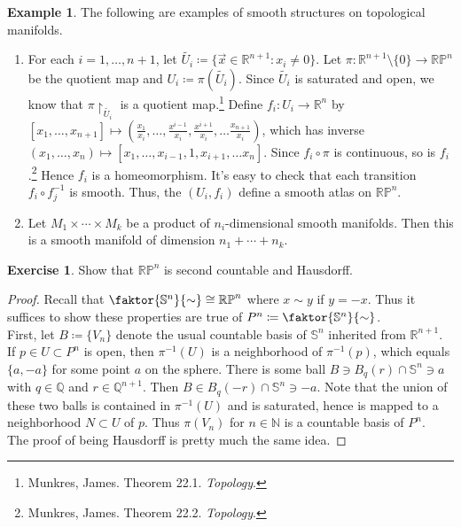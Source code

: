 \documentclass[10pt,letterpaper,cm]{nupset}
\theoremstyle{definition}
\newtheorem{exmp}{Example}
\newtheorem{exercise}{Exercise}
\newcommand{\N}{\mathbb N}
\newcommand{\Q}{\mathbb Q}
\newcommand{\R}{\mathbb R}
\newcommand{\RP}{\mathbb{RP}}
\renewcommand{\S}{\mathbb S}
\newcommand{\1}{\mathbf{1}}
\newcommand{\x}{\vec x}
\newcommand{\0}{\vec 0}
\begin{document}
\begin{exmp}{The following are examples of smooth structures on topological manifolds.}
\begin{enumerate}
\item For each $i = 1, \ldots, n+1$, let $\tilde{U_i}\coloneqq  \{\x \in \R^{n+1} : x_i \ne 0\}$. Let $\pi: \R^{n+1} \setminus\{0\} \to \RP^n$ be the quotient map and $U_i \coloneqq  \pi(\tilde{U_i})$. Since $\tilde{U_i}$ is saturated and open, we know that $\pi \restriction_{\tilde{U_i}}$ is a quotient map.\footnote{Munkres, James. Theorem 22.1. \textit{Topology}.} Define $f_i : U_i \to \R^n$ by $[x_1, \ldots, x_{n+1}] \mapsto (\frac{x_1}{x_i}, \ldots, \frac{x^{i-1}}{x_i}, \frac{x^{i+1}}{x_i}, \ldots \frac{x_{n+1}}{x_i})$, which has inverse $(x_1, \ldots, x_n) \mapsto [x_1, \ldots, x_{i-1}, 1, x_{i+1}, \ldots x_n]$. Since $f_i \circ \pi$ is continuous, so is $f_i$.\footnote{Munkres, James. Theorem 22.2. \textit{Topology}.} Hence $f_i$ is a homeomorphism. It's easy to check that each transition $f_i \circ f_j^{-1}$ is smooth. Thus, the $(U_i, f_i)$ define a smooth atlas on $\RP^n$.
\item Let $M_1 \times \cdots \times M_k$ be a product of $n_i$-dimensional smooth manifolds. Then this is a smooth manifold of dimension $n_1 + \cdots + n_k$.
\end{enumerate}

\end{exmp}

\begin{exercise} Show that $\RP^n$ is second countable and Hausdorff. 
\end{exercise}

\begin{proof}
Recall that $\faktor{\S^n}{\sim} \cong \RP^n$ where $x \sim y$ if $y = -x$. Thus it suffices to show these properties are true of $P^n\coloneqq  \faktor{\S^n}{\sim}$. 
\\ First, let $B\coloneqq \{V_n\}$ denote the usual countable basis of $\S^n$ inherited from $\R^{n+1}$. If $p\in U\subset P^n$ is open, then $\pi^{-1}(U)$ is a neighborhood of $\pi^{-1}(p)$, which equals $\{a, -a\}$ for some point $a$ on the sphere.  There is some ball $B \ni B_q(r) \cap \S^n \ni a$ with $q\in \Q$ and $r \in \Q^{n+1}$. Then $B \in B_q(-r) \cap \S^n \ni -a$. Note that the union of these two balls is contained in $\pi^{-1}(U)$ and is saturated, hence is mapped to a neighborhood $N \subset U$ of $p$. Thus $\pi(V_n)$ for $n\in \N$ is a countable basis of $P^n$.
\\ The proof of being Hausdorff is pretty much the same idea.
\end{proof}
\end{document}
